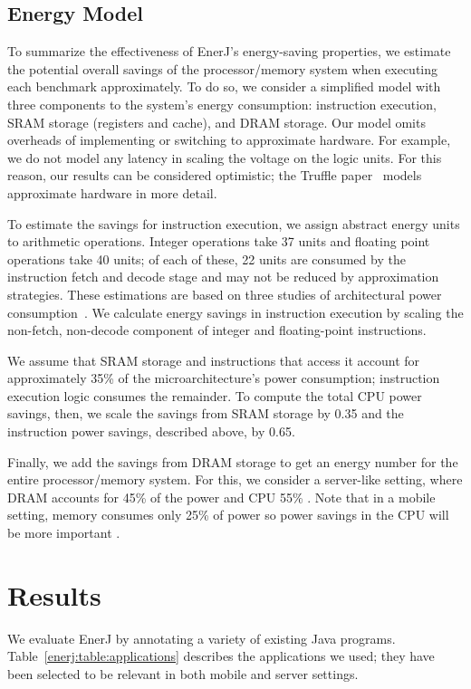 \subsection{Energy Model}
\label{enerj:energymodel}
To summarize the effectiveness of EnerJ's energy-saving properties, we estimate
the potential overall savings of the processor/memory system when executing
each benchmark approximately. To do so, we consider a simplified model with
three components to the system's energy consumption: instruction execution,
SRAM storage (registers and cache), and DRAM storage.
Our model omits overheads of implementing or switching to approximate hardware.
For example, we do not model any latency in scaling the voltage on the logic
units.
For this reason, our results can be considered optimistic;
the Truffle paper~\cite{truffle} models approximate hardware in more detail.

To estimate the savings for instruction execution, we assign abstract energy
units to arithmetic operations. Integer operations take 37 units and floating point
operations take 40 units; of each of these, 22 units are consumed by the
instruction fetch and decode stage and may not be reduced by approximation
strategies. These estimations are based on three studies of architectural
power consumption~\cite{mcpat,burger2003,wattch}.
We calculate energy savings in instruction execution by scaling the
non-fetch, non-decode component of integer and floating-point instructions.

We assume that SRAM storage and instructions that access it account
for approximately 35\% of the microarchitecture's power consumption;
instruction execution logic consumes the remainder. To compute the
total CPU power savings, then, we scale the savings from SRAM storage
by 0.35 and the instruction power savings, described above, by 0.65.

Finally, we add the savings from DRAM storage to get an energy number for the
entire processor/memory system. For this, we consider a server-like setting,
where DRAM accounts for 45\% of the power and CPU 55\% \cite{googlepower}. Note
that in a mobile setting, memory consumes only 25\% of power so power savings in
the CPU will be more important \cite{carroll2010}.

\section{Results}
\label{enerj:sec:res}

We evaluate EnerJ by annotating a variety of existing Java
programs. Table~\ref{enerj:table:applications} describes the applications we
used; they have been selected to be relevant in both mobile and server
settings. %

